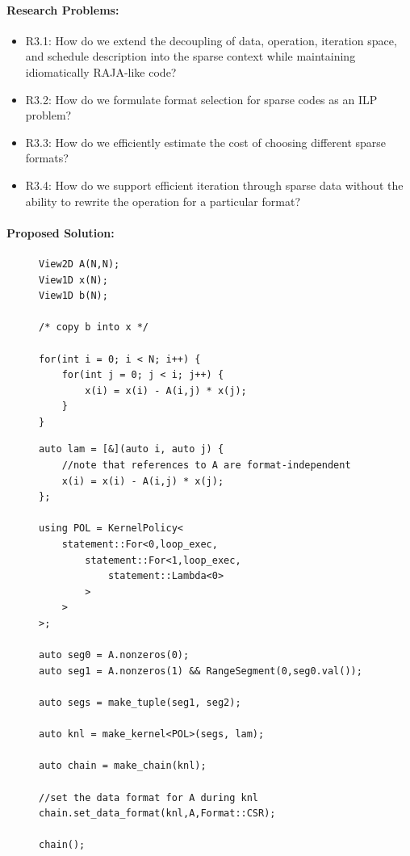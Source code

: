 \documentclass{article}
\begin{document}
\paragraph{Research Problems:}
\begin{itemize}
    \item R3.1: How do we extend the decoupling of data, operation, iteration space, and schedule description into the sparse context while maintaining idiomatically RAJA-like code?
    \item R3.2: How do we formulate format selection for sparse codes as an ILP problem?
    \item R3.3: How do we efficiently estimate the cost of choosing different sparse formats?
    \item R3.4: How do we support efficient iteration through sparse data without the ability to rewrite the operation for a particular format? 
\end{itemize}


\paragraph{Proposed Solution:}


\begin{figure}
\begin{lstlisting}[label={ForwardSolveC},caption={C-like implementation of forward substitution using Views}]
View2D A(N,N);
View1D x(N);
View1D b(N);

/* copy b into x */

for(int i = 0; i < N; i++) {
    for(int j = 0; j < i; j++) {
        x(i) = x(i) - A(i,j) * x(j);
    }
}
\end{lstlisting}
\end{figure}


\begin{figure}
\begin{lstlisting}[caption={Possible RAJA implementation of forward substitution.},label={ForwardSolveRAJA}]
auto lam = [&](auto i, auto j) {
    //note that references to A are format-independent
    x(i) = x(i) - A(i,j) * x(j);
};

using POL = KernelPolicy<
    statement::For<0,loop_exec,
        statement::For<1,loop_exec,
            statement::Lambda<0>
        >
    >
>;

auto seg0 = A.nonzeros(0);
auto seg1 = A.nonzeros(1) && RangeSegment(0,seg0.val());

auto segs = make_tuple(seg1, seg2);

auto knl = make_kernel<POL>(segs, lam);

auto chain = make_chain(knl);

//set the data format for A during knl
chain.set_data_format(knl,A,Format::CSR);

chain();

\end{lstlisting}
\end{figure}
\end{document}
